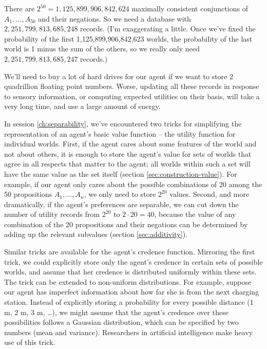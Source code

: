 
There are $2^{50} = 1,125,899,906,842,624$ maximally consistent
conjunctions of $A_1,\ldots,A_{50}$ and their negations.  So we need a
database with $2,251,799,813,685,248$ records. (I'm exaggerating a
little. Once we've fixed the probability of the first
1,125,899,906,842,623 worlds, the probability of the last world is 1
minus the sum of the others, so we really only need
$2,251,799,813,685,247$ records.)

We'll need to buy a lot of hard drives for our agent if we want to
store 2 quadrillion floating point numbers. Worse, updating all these
records in response to sensory information, or computing expected
utilities on their basis, will take a very long time, and use a large
amount of energy.

In session \ref{ch:separability}, we've encountered two tricks for
simplifying the representation of an agent's basic value function --
the utility function for individual worlds. First, if the agent cares
about some features of the world and not about others, it is enough to
store the agent's value for sets of worlds that agree in all respects
that matter to the agent; all worlds within such a set will have the
same value as the set itself (section
\ref{sec:construction-value}). For example, if our agent only cares
about the possible combinations of 20 among the 50 propositions
$A_1,\ldots,A_n$, we only need to store $2^{20}$ values. Second, and
more dramatically, if the agent's preferences are separable, we can
cut down the number of utility records from $2^{20}$ to $2 \cdot 20 =
40$, because the value of any combination of the 20 propositions and
their negations can be determined by adding up the relevant subvalues
(section \ref{sec:additivity}).

Similar tricks are available for the agent's credence
function. Mirroring the first trick, we could explicitly store only
the agent's credence in certain sets of possible worlds, and assume
that her credence is distributed uniformly within these sets. The
trick can be extended to non-uniform distributions. For example,
suppose our agent has imperfect information about how far she is from
the next charging station. Instead of explicitly storing a probability
for every possible distance (1 m, 2 m, 3 m, \ldots), we might assume
that the agent's credence over these possibilities follows a Gaussian
distribution, which can be specified by two numbers (mean and
variance). Researchers in artificial intelligence make heavy use of
this trick.

